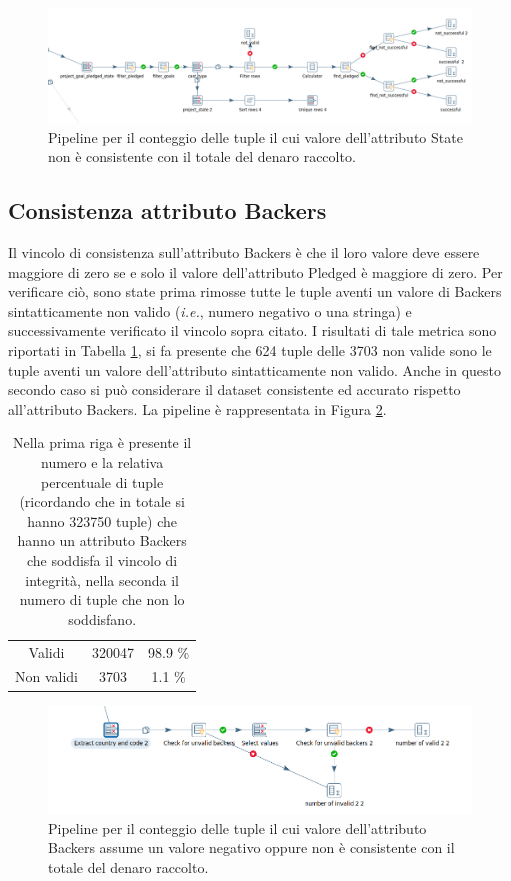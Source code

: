 \begin{figure}[h!]
	\centering
	\includegraphics[width=0.7\linewidth]{images/DQ_stateaconsistency}
	\caption{Pipeline per il conteggio delle tuple il cui valore dell'attributo State non è consistente con il totale del denaro raccolto.}
	\label{fig:dqstateaconsistency}
\end{figure}

\newpage
\subsection{Consistenza attributo Backers}
\label{subsec:cons_backers}
Il vincolo di consistenza sull'attributo Backers è che il loro valore deve essere maggiore di zero se e solo il valore dell'attributo Pledged è maggiore di zero.
Per verificare ciò, sono state prima rimosse tutte le tuple aventi un valore di Backers sintatticamente non valido (\textit{i.e.}, numero negativo o una stringa) e successivamente verificato il vincolo sopra citato.
I risultati di tale metrica sono riportati in Tabella \ref{tab:con_backers}, si fa presente che 624 tuple delle 3703 non valide sono le tuple aventi un valore dell'attributo sintatticamente non valido.
Anche in questo secondo caso si può considerare il dataset consistente ed accurato rispetto all'attributo Backers.
La pipeline è rappresentata in Figura \ref{fig:dqbackersconsistency}.

\begin{table}
	\caption{Nella prima riga è presente il numero e la relativa percentuale di tuple (ricordando che in totale si hanno 323750 tuple) che hanno un attributo Backers che soddisfa il vincolo di integrità, nella seconda il numero di tuple che non lo soddisfano.}
	
	\label{tab:con_backers}
	
	\centering
	\begin{tabular}{c|cc}
		Validi & 320047 & 98.9 \% \\ 
		Non validi & 3703 & 1.1 \% \\
	\end{tabular}
\end{table} 

\begin{figure}[h!]
	\centering
	\includegraphics[width=0.7\linewidth]{images/DQ_backersconsistency}
	\caption{Pipeline per il conteggio delle tuple il cui valore dell'attributo Backers assume un valore negativo oppure non è consistente con il totale del denaro raccolto.}
	\label{fig:dqbackersconsistency}
\end{figure}

